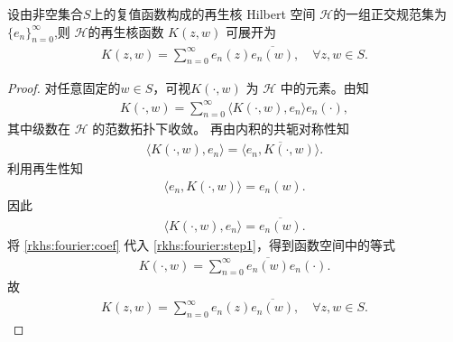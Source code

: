 \documentclass[../../main.tex]{subfiles}%
\begin{document}
\begin{theorem}\label{theorem:再生核可由正交规范集生成}
设由非空集合$S$上的复值函数构成的再生核 Hilbert 空间 $\mathcal{H}$的一组正交规范集为$\{e_n\}_{n=0}^{\infty}$,则 $\mathcal{H}$的再生核函数 $K(z,w)$ 可展开为
\begin{align*}
K(z,w)=\sum_{n=0}^{\infty} e_n(z)\overline{e_n(w)},\quad \forall z,w\in S. 
\end{align*}
\end{theorem}
\begin{proof}
对任意固定的$w\in S$，可视$K(\cdot,w)$ 为 $\mathcal{H}$ 中的元素。由知
\begin{align}
K(\cdot,w)=\sum_{n=0}^{\infty}\langle K(\cdot,w),e_n\rangle e_n(\cdot), \label{rkhs:fourier:step1}
\end{align}
其中级数在 $\mathcal{H}$ 的范数拓扑下收敛。
再由内积的共轭对称性知
\begin{align}
\langle K(\cdot,w),e_n\rangle=\overline{\langle e_n,K(\cdot,w)\rangle}. \nonumber
\end{align}
利用再生性知
\begin{align}
\langle e_n,K(\cdot,w)\rangle=e_n(w). \nonumber
\end{align}
因此
\begin{align}
\langle K(\cdot,w),e_n\rangle=\overline{e_n(w)}. \label{rkhs:fourier:coef}
\end{align}
将 \eqref{rkhs:fourier:coef} 代入 \eqref{rkhs:fourier:step1}，得到函数空间中的等式
\begin{align}
K(\cdot,w)=\sum_{n=0}^{\infty}\overline{e_n(w)}e_n(\cdot). \label{rkhs:fourier:func}
\end{align}
故
\begin{align}
K(z,w)=\sum_{n=0}^{\infty} e_n(z)\overline{e_n(w)},\quad \forall z,w\in S. \nonumber
\end{align}\end{proof}
\end{document}
